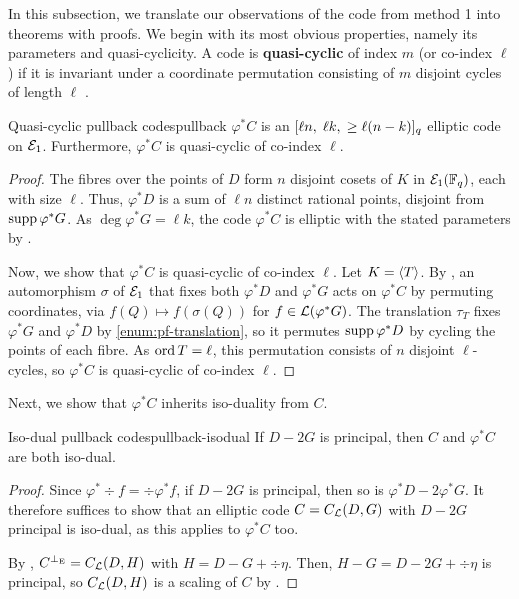 \documentclass[twocolumn, 11pt]{scrartcl}
\begin{document}
In this subsection, we translate our observations of the code from method 1 into theorems with proofs. We begin with its most obvious properties, namely its parameters and quasi-cyclicity. A code is \textbf{quasi-cyclic} of index $m$ (or co-index $\ell$) if it is invariant under a coordinate permutation consisting of $m$ disjoint cycles of length $\ell$ \cite{ling2001algebraic}.

\begin{theorem}{Quasi-cyclic pullback codes}{pullback}
$\varphi^*C$ is an $[\ell n,\;\ell k,\;\geq\ell(n-k)]_q$ elliptic code on $\mathcal{E}_1$. Furthermore, $\varphi^*C$ is quasi-cyclic of co-index $\ell$.
\end{theorem}

\begin{proof}
The fibres over the points of $D$ form $n$ disjoint cosets of $K$ in $\mathcal{E}_1(\mathbb{F}_q)$, each with size $\ell$. Thus, $\varphi^*D$ is a sum of $\ell n$ distinct rational points, disjoint from $\operatorname{supp}\varphi^*G$. As $\deg\varphi^*G=\ell k$, the code $\varphi^*C$ is elliptic with the stated parameters by .

Now, we show that $\varphi^*C$ is quasi-cyclic of co-index $\ell$. Let $K=\langle T\rangle$. By \cite[Prop.~8.2.3(a)]{stichtenoth2009algebraic}, an automorphism $\sigma$ of $\mathcal{E}_1$ that fixes both $\varphi^*D$ and $\varphi^*G$ acts on $\varphi^*C$ by permuting coordinates, via $f(Q)\mapsto f(\sigma(Q))$ for $f\in\mathcal{L}(\varphi^*G)$. The translation $\tau_T$ fixes $\varphi^*G$ and $\varphi^*D$ by \ref{enum:pf-translation}, so it permutes $\operatorname{supp}\varphi^*D$ by cycling the points of each fibre. As $\operatorname{ord} T=\ell$, this permutation consists of $n$ disjoint $\ell$-cycles, so $\varphi^*C$ is quasi-cyclic of co-index $\ell$.
\end{proof}

Next, we show that $\varphi^*C$ inherits iso-duality from $C$.

\begin{corollary}{Iso-dual pullback codes}{pullback-isodual}
    If $D-2G$ is principal, then $C$ and $\varphi^*C$ are both iso-dual.
\end{corollary}

\begin{proof}
    Since $\varphi^*\div f=\div\varphi^*f$, if $D-2G$ is principal, then so is $\varphi^*D-2\varphi^*G$. It therefore suffices to show that an elliptic code $C=C_\mathcal{L}(D,G)$ with $D-2G$ principal is iso-dual, as this applies to $\varphi^*C$ too.
    
    By , $C^{\perp_\mathrm{E}}=C_\mathcal{L}(D,H)$ with $H=D-G+\div\eta$. Then, $H-G=D-2G+\div\eta$ is principal, so $C_\mathcal{L}(D,H)$ is a scaling of $C$ by .
\end{proof}
\end{document}

